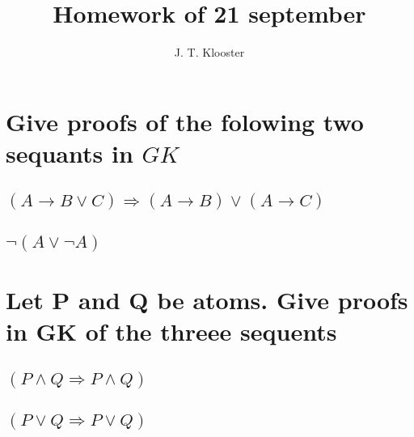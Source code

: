 \documentclass{article}
\begin{document}
\author{J. T. Klooster}
\title{Homework of 21 september}
\maketitle

\section{Give proofs of the folowing two sequants in $GK$}
\subsection{$(A\to B\vee C)\Rightarrow(A\to B)\vee(A\to C)$}

\begin{prooftree}
\end{prooftree}

\subsection{$\neg(A\vee\neg A)$}
\section{Let P and Q be atoms. Give proofs in GK of the threee sequents}
\subsection{$(P\wedge Q \Rightarrow P \wedge Q)$}
\subsection{$(P\vee Q \Rightarrow P \vee Q)$}
\end{document}
